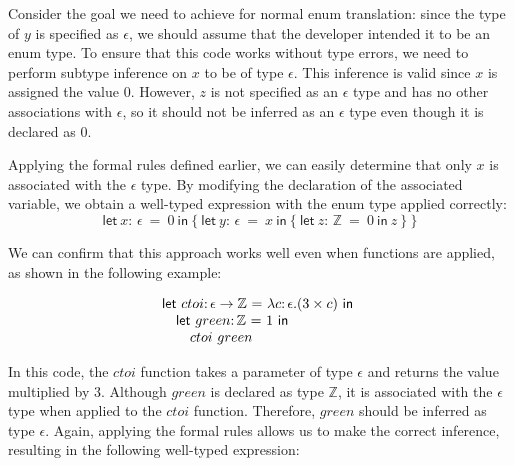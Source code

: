 \documentclass[10pt,conference]{IEEEtran}
\newcommand{\Z}{\ensuremath{\mathbb{Z}}}
\newcommand{\lett}[4]{\ensuremath{\mathsf{let}\ #1\mathsf{:}\,#2\ \mathsf{=}\ #3\ \mathsf{in}\ #4}}
\newcommand{\funct}[3]{\ensuremath{\lambda #1\mathsf{:}\,#2.#3}}
\newcommand{\apply}[2]{\ensuremath{#1\ #2}}
\begin{document}
Consider the goal we need to achieve for normal enum translation: since the type of $y$ is specified as $\epsilon$, we should assume that the developer intended it to be an enum type. To ensure that this code works without type errors, we need to perform subtype inference on $x$ to be of type $\epsilon$. This inference is valid since $x$ is assigned the value 0. However, $z$ is not specified as an $\epsilon$ type and has no other associations with $\epsilon$, so it should not be inferred as an $\epsilon$ type even though it is declared as 0.

Applying the formal rules defined earlier, we can easily determine that only $x$ is associated with the $\epsilon$ type.
By modifying the declaration of the associated variable, we obtain a well-typed expression with the enum type applied correctly:
\[
\lett{x}{\epsilon}{0}{
    \{\ \lett{y}{\epsilon}{x}{\{\ 
        \lett{z}{\Z}{0}{z}
    \ \}}\ \}
}\]

We can confirm that this approach works well even when functions are applied, as shown in the following example:

\[
\begin{array}{l}
    \lett{ctoi}{\arrowt{\epsilon}{\Z}}{\funct{c}{\epsilon}{(3\times c)}}{}\\
    \quad \lett{green}{\Z}{1}{} \\
    \quad \quad \apply{ctoi}{green}
\end{array}
\]

In this code, the \ensuremath{ctoi} function takes a parameter of type $\epsilon$ and returns the value multiplied by 3. Although \ensuremath{green} is declared as type \ensuremath{\Z}, it is associated with the $\epsilon$ type when applied to the \ensuremath{ctoi} function. Therefore, \ensuremath{green} should be inferred as type $\epsilon$. Again, applying the formal rules allows us to make the correct inference, resulting in the following well-typed expression:
\end{document}
